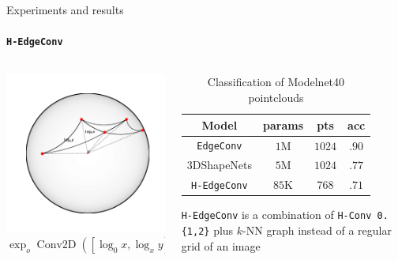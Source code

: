 \begin{frame}{Experiments and results}
    \framesubtitle{\texttt{H-EdgeConv}}

    \begin{columns}
        \begin{column}{.4\linewidth}\centering
                \includegraphics[width=.85\linewidth]{art/hedgeconv-features.pdf}
                \[\exp_o \operatorname{Conv2D}([\log_0x, \log_xy])\]
        \end{column}
        \begin{column}{.6\linewidth}
            \begin{table}[h!]
                \centering
                \begin{tabular}{|c c c c|} 
                    \hline
                    Model & params &
                    pts & acc
                    \\ [0.5ex] 
                    \hline\hline
                    \texttt{EdgeConv} & \( 1 \)M & \(1024\) & \(.90\)  \\ 
                    {\small 3DShapeNets} & \( 5 \)M & \(1024\) & \(.77\)  \\ 
                    \texttt{H-EdgeConv} & \( 85 \)K & 768 &  \( .71 \) \\ [1ex] 
                    \hline
                \end{tabular}
                \caption{Classification of Modelnet40 pointclouds}
            \end{table}

            \texttt{H-EdgeConv} is a combination of \texttt{H-Conv 0.\{1,2\}}
            plus \(k\)-NN graph instead of a regular grid of an image
        \end{column}
    \end{columns}
\end{frame}

